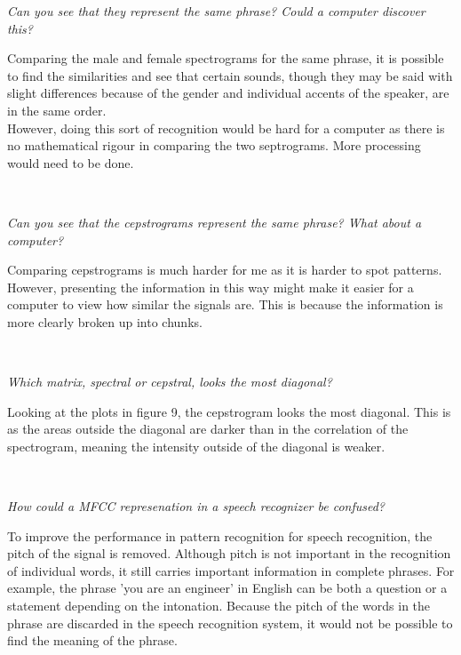 \documentclass[11pt]{article}   %
\begin{document}
\textit{Can you see that they represent the same phrase? Could a computer discover this?}\\

\begin{adjustwidth}{2.5em}{0pt}
Comparing the male and female spectrograms for the same phrase, it is possible to find the similarities and see that certain sounds, though they may be said with slight differences because of the gender and individual accents of the speaker, are in the same order. \\

However, doing this sort of recognition would be hard for a computer as there is no mathematical rigour in comparing the two septrograms. More processing would need to be done.

\end{adjustwidth}\

\textit{Can you see that the cepstrograms represent the same phrase? What about a computer?}\\

\begin{adjustwidth}{2.5em}{0pt}
Comparing cepstrograms is much harder for me as it is harder to spot patterns. However, presenting the information in this way might make it easier for a computer to view how similar the signals are. This is because the information is more clearly broken up into chunks.
\end{adjustwidth}\

\textit{Which matrix, spectral or cepstral, looks the most diagonal?}\\

\begin{adjustwidth}{2.5em}{0pt}
Looking at the plots in figure 9, the cepstrogram looks the most diagonal. This is as the areas outside the diagonal are darker than in the correlation of the spectrogram, meaning the intensity outside of the diagonal is weaker.

\end{adjustwidth}\

\textit{How could a MFCC represenation in a speech recognizer be confused?}\\

\begin{adjustwidth}{2.5em}{0pt}
To improve the performance in pattern recognition for speech recognition, the pitch of the signal is removed. Although pitch is not important in the recognition of individual words, it still carries important information in complete phrases. For example, the phrase 'you are an engineer' in English can be both a question or a statement depending on the intonation. Because the pitch of the words in the phrase are discarded in the speech recognition system, it would not be possible to find the meaning of the phrase. \end{adjustwidth}\
\end{document}
